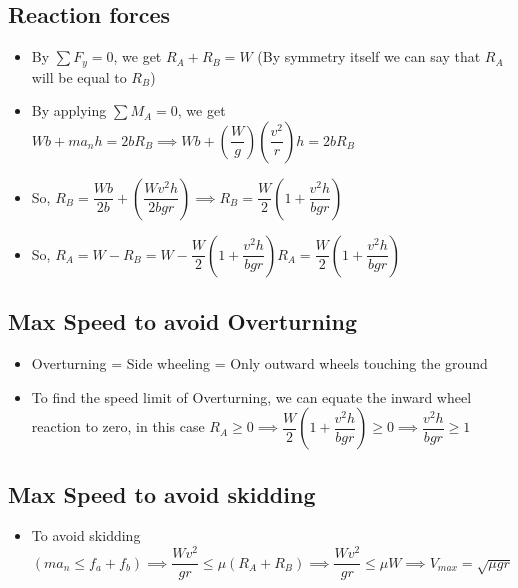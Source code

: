 \documentclass[8pt]{report}
\begin{document}
	\subsection{Reaction forces}
		\begin{itemize}
			\item By $\sum F_y=0$, we get $R_A + R_B = W$ (By symmetry itself we can say that $R_A$ will be equal to $R_B$)
			\item By applying $\sum M_A=0$, we get $Wb+ma_nh=2bR_B \implies Wb+\left(\dfrac{W}{g}\right)\left(\dfrac{v^2}{r}\right)h=2bR_B$
			\item So, $R_B=\dfrac{Wb}{2b}+\left(\dfrac{Wv^2h}{2bgr}\right) \implies \boxed{R_B=\dfrac{W}{2}\left(1+\dfrac{v^2h}{bgr}\right)}$
			\item So, $R_A = W-R_B = W-\dfrac{W}{2}\left(1+\dfrac{v^2h}{bgr}\right) \boxed{R_A=\dfrac{W}{2}\left(1+\dfrac{v^2h}{bgr}\right)} $
		\end{itemize}
	\subsection{Max Speed to avoid Overturning}
		\begin{itemize}
			\item Overturning = Side wheeling = Only outward wheels touching the ground
			\item To find the speed limit of Overturning, we can equate the inward wheel reaction to zero, in this case $R_A\geq 0 \implies \dfrac{W}{2}\left(1+\dfrac{v^2h}{bgr}\right)\geq 0 \implies \boxed{ \dfrac{v^2h}{bgr}\geq 1}$
		\end{itemize}
	\subsection{Max Speed to avoid skidding}
		\begin{itemize}
			\item To avoid skidding $\left(ma_n\le f_a + f_b\right) \implies \dfrac{Wv^2}{gr}\le\mu(R_A+R_B) \implies \dfrac{Wv^2}{gr}\le \mu W \implies \boxed{V_{max} = \sqrt{\mu gr}}$
		\end{itemize}\hrulefill
\end{document}
